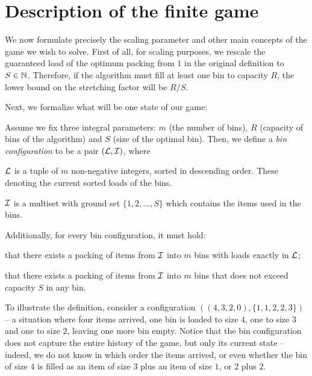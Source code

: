 \section{Description of the finite game}

We now formulate precisely the scaling parameter and other main
concepts of the game we wish to solve. First of all, for scaling
purposes, we rescale the guaranteed load of the optimum packing from
$1$ in the original definition to $S \in \mathbb{N}$. Therefore, if the
algorithm must fill at least one bin to capacity $R$, the lower bound
on the stretching factor will be $R/S$.

Next, we formalize what will be one state of our game:

\begin{dfn}\label{dfn:binconf}
  Assume we fix three integral parameters: $m$ (the number of bins), $R$ (capacity of bins of the algorithm)
and $S$ (size of the optimal bin). Then, we define a \emph{bin configuration} to be a pair
  $({\mathcal L},{\mathcal I})$, where
  \begin{compactitem}
    \item ${\mathcal L}$ is a tuple of $m$ non-negative integers, sorted in descending order. These denoting the current sorted loads of the bins.
    \item ${\mathcal I}$ is a multiset with ground set $\{1,2,\ldots,S\}$ which contains the items used in the bins.
  \end{compactitem}

  Additionally, for every bin configuration, it must hold:
  \begin{compactitem}
    \item that there exists a packing of items from ${\mathcal I}$ into $m$ bins with loads exactly in ${\mathcal L}$;
    \item that there exists a packing of items from ${\mathcal I}$ into $m$ bins that does not exceed capacity $S$ in any bin.
  \end{compactitem}  
\end{dfn}

To illustrate the definition, consider a configuration
$((4,3,2,0),\{1,1,2,2,3\})$ -- a situation where four items arrived,
one bin is loaded to size $4$, one to size $3$ and one to size $2$,
leaving one more bin empty. Notice that the bin configuration does not
capture the entire history of the game, but only its current state --
indeed, we do not know in which order the items arrived, or even
whether the bin of size $4$ is filled as an item of size $3$ plus an
item of size $1$, or $2$ plus $2$.

